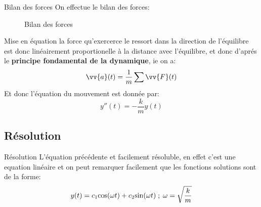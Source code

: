 \documentclass{beamer}
\begin{document}
            \begin{frame}{Bilan des forces}
                On effectue le bilan des forces:
                \begin{figure}
                    \centering               
                \caption{Bilan des forces}
                \end{figure}    
            \end{frame}     
            \begin{frame}{Mise en équation}
                la force qu'exercerce le ressort dans la direction de l'équilibre est donc linéairement proportionelle à la distance avec l'équilibre, et donc d'aprés le \textbf{principe fondamental de la dynamique}, ie on a:    
                \[
                    \vv{a}(t) = \frac{1}{m}\sum \vv{F}(t)
                \]
                Et donc l'équation du mouvement est donnée par:
                \[
                    \boxed{y''(t) = -\frac{k}{m}y(t)}
                \]
            \end{frame}      
        \subsection{Résolution}
            \begin{frame}{Résolution}
                L'équation précédente et facilement résoluble, en effet c'est une equation linéaire et on peut remarquer facilement que les fonctions solutions sont de la forme:
                \[
                    y(t) = c_1\text{\fontfamily{cmr}\selectfont cos}(\omega t) + c_2\text{\fontfamily{cmr}\selectfont sin}(\omega t) \; ; \; \omega = \sqrt{\frac{k}{m}}
                \]
            \end{frame}
\end{document}
